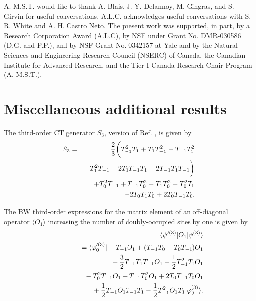 \documentclass[floatfix,twocolumn,aps,prb,showpacs,superscriptaddress]{revtex4}
\begin{document}


\begin{acknowledgments}
A.-M.S.T. would like to thank A. Blais, J.-Y. Delannoy, M. Gingras,
and S. Girvin for useful conversations. A.L.C. acknowledges useful
conversations with S. R. White and A. H. Castro Neto.
The present work was supported, in part, by a Research Corporation Award
(A.L.C), by NSF under Grant No. DMR-030586 (D.G. and P.P.), and
by NSF Grant No. 0342157 at Yale and by the Natural Sciences and
Engineering Research Council (NSERC) of Canada, the Canadian Institute for
Advanced Research, and the Tier I Canada Research Chair Program
(A.-M.S.T.).
\end{acknowledgments}




\appendix


\section{Miscellaneous additional results}


\label{app_A}


The third-order CT generator $S_3$, version of Ref. %
, is given by
\begin{eqnarray}  \label{S3}
S_3&=&\frac23\bigg( T_{-1}^2T_1+T_1T_{-1}^2-T_{-1}T_{1}^{2}  \nonumber
\\
&&-T_{1}^{2}T_{-1}+2T_1T_{-1}T_1-2T_{-1}T_1T_{-1}\bigg) \\
&&+T_{0}^{2}T_{-1}+T_{-1}T_{0}^{2}-T_1T_{0}^{2}-T_{0}^{2}T_1  \nonumber \\
&&-2T_0T_1T_0+2T_0T_{-1}T_0.  \nonumber
\end{eqnarray}


The BW third-order expressions for the matrix element of an off-diagonal
operator $\langle O_{1}\rangle $ increasing the number of doubly-occupied
sites by one is given by
\begin{eqnarray}  \label{O_3A}
&&\langle \psi^{\prime(3)}\vert O_{1}\vert \psi^{(3)}\rangle  \nonumber \\
&&\phantom{\langle \psi^{\prime(3)}|} =\langle \varphi_{0}^{\prime(3)}\vert
- T_{-1}O_1 +(T_{-1}T_0-T_0T_{-1})O_1  \nonumber \\
&&\phantom{\langle \psi^{\prime(3)}|} +\frac32 T_{-1}T_1T_{-1}O_1-\frac12
\tm^2T_1O_1 \\
&&\phantom{\langle \psi^{\prime(3)}|}
-T_{0}^{2}T_{-1}O_1-T_{-1}T_{0}^{2}O_1+2T_0T_{-1}T_0O_1  \nonumber \\
&&\phantom{\langle \psi^{\prime(3)}|} +\frac12 T_{-1}O_1T_{-1}T_1-\frac12
\tm^2O_1T_1\vert \varphi_{0}^{(3)}\rangle .  \nonumber  \label{O_3}
\end{eqnarray}
\end{document}
